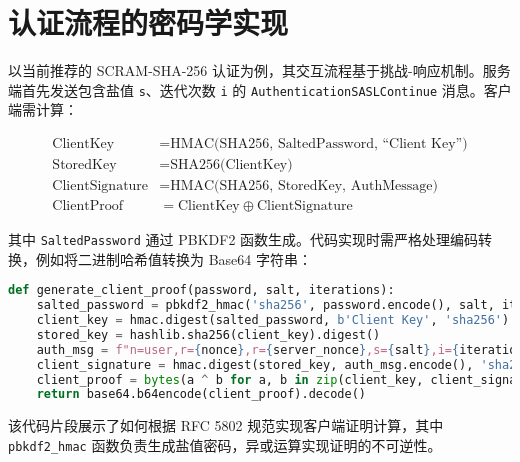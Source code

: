 \section{认证流程的密码学实现}
以当前推荐的 SCRAM-SHA-256 认证为例，其交互流程基于挑战-响应机制。服务端首先发送包含盐值 \verb!s!、迭代次数 \verb!i! 的 \verb!AuthenticationSASLContinue! 消息。客户端需计算：\par
$$ \begin{aligned} \text{ClientKey} &= \text{HMAC(SHA256, SaltedPassword, ``Client Key'')} \\ \text{StoredKey} &= \text{SHA256(ClientKey)} \\ \text{ClientSignature} &= \text{HMAC(SHA256, StoredKey, AuthMessage)} \\ \text{ClientProof} &= \text{ClientKey} \oplus \text{ClientSignature} \end{aligned} $$\par
其中 \verb!SaltedPassword! 通过 PBKDF2 函数生成。代码实现时需严格处理编码转换，例如将二进制哈希值转换为 Base64 字符串：\par
\begin{lstlisting}[language=python]
def generate_client_proof(password, salt, iterations):
    salted_password = pbkdf2_hmac('sha256', password.encode(), salt, iterations)
    client_key = hmac.digest(salted_password, b'Client Key', 'sha256')
    stored_key = hashlib.sha256(client_key).digest()
    auth_msg = f"n=user,r={nonce},r={server_nonce},s={salt},i={iterations},..."
    client_signature = hmac.digest(stored_key, auth_msg.encode(), 'sha256')
    client_proof = bytes(a ^ b for a, b in zip(client_key, client_signature))
    return base64.b64encode(client_proof).decode()
\end{lstlisting}
该代码片段展示了如何根据 RFC 5802 规范实现客户端证明计算，其中 \verb!pbkdf2_hmac! 函数负责生成盐值密码，异或运算实现证明的不可逆性。\par
